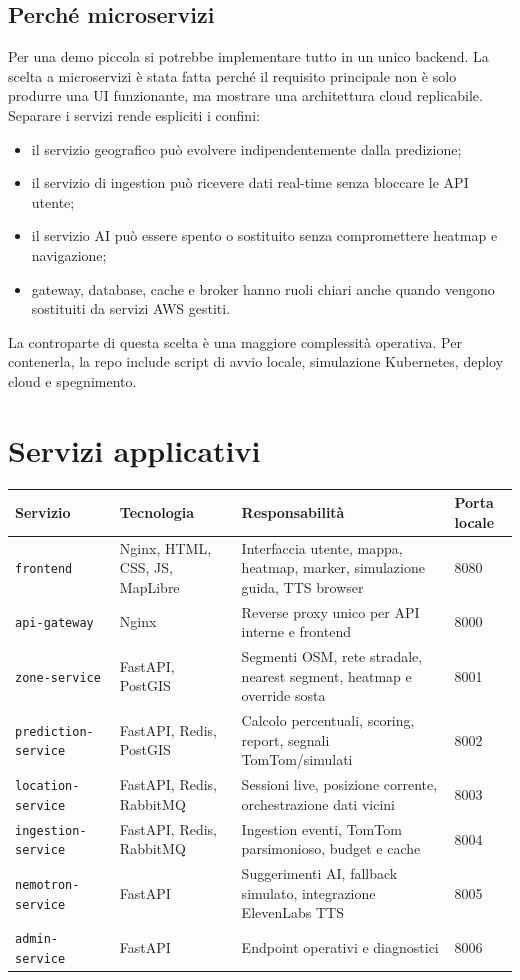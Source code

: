 \documentclass[11pt,a4paper]{article}
\newcommand{\service}[1]{\texttt{#1}}
\begin{document}
\subsection{Perch\'e microservizi}

Per una demo piccola si potrebbe implementare tutto in un unico backend. La scelta a microservizi \`e stata fatta perch\'e il requisito principale non \`e solo produrre una UI funzionante, ma mostrare una architettura cloud replicabile. Separare i servizi rende espliciti i confini:

\begin{itemize}
  \item il servizio geografico pu\`o evolvere indipendentemente dalla predizione;
  \item il servizio di ingestion pu\`o ricevere dati real-time senza bloccare le API utente;
  \item il servizio AI pu\`o essere spento o sostituito senza compromettere heatmap e navigazione;
  \item gateway, database, cache e broker hanno ruoli chiari anche quando vengono sostituiti da servizi AWS gestiti.
\end{itemize}

La controparte di questa scelta \`e una maggiore complessit\`a operativa. Per contenerla, la repo include script di avvio locale, simulazione Kubernetes, deploy cloud e spegnimento.

\section{Servizi applicativi}

\small
\begin{longtable}{@{}p{4.0cm}p{2.7cm}p{5.8cm}p{1.5cm}@{}}
\toprule
Servizio & Tecnologia & Responsabilit\`a & Porta locale \\
\midrule
\endhead
\service{frontend} & Nginx, HTML, CSS, JS, MapLibre & Interfaccia utente, mappa, heatmap, marker, simulazione guida, TTS browser & 8080 \\
\service{api-gateway} & Nginx & Reverse proxy unico per API interne e frontend & 8000 \\
\service{zone-service} & FastAPI, PostGIS & Segmenti OSM, rete stradale, nearest segment, heatmap e override sosta & 8001 \\
\service{prediction-service} & FastAPI, Redis, PostGIS & Calcolo percentuali, scoring, report, segnali TomTom/simulati & 8002 \\
\service{location-service} & FastAPI, Redis, RabbitMQ & Sessioni live, posizione corrente, orchestrazione dati vicini & 8003 \\
\service{ingestion-service} & FastAPI, Redis, RabbitMQ & Ingestion eventi, TomTom parsimonioso, budget e cache & 8004 \\
\service{nemotron-service} & FastAPI & Suggerimenti AI, fallback simulato, integrazione ElevenLabs TTS & 8005 \\
\service{admin-service} & FastAPI & Endpoint operativi e diagnostici & 8006 \\
\bottomrule
\end{longtable}
\normalsize
\end{document}
